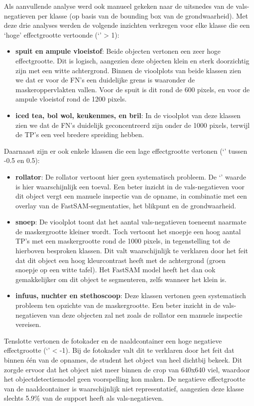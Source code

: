 Als aanvullende analyse werd ook manueel gekeken naar de uitsnedes van de vals-negatieven per klasse (op basis van de bounding box van de grondwaarheid).
Met deze drie analyses werden de volgende inzichten verkregen voor elke klasse die een `hoge' effectgrootte vertoonde (`' > 1):
\begin{itemize}
    \item \textbf{spuit en ampule vloeistof}: Beide objecten vertonen een zeer hoge effectgrootte.
    Dit is logisch, aangezien deze objecten klein en sterk doorzichtig zijn met een witte achtergrond. 
    Binnen de vioolplots van beide klassen zien we dat er voor de FN's een duidelijke grens is waaronder de maskeroppervlakten vallen. 
    Voor de spuit is dit rond de 600 pixels, en voor de ampule vloeistof rond de 1200 pixels.
    \item \textbf{iced tea, bol wol, keukenmes, en bril}: In de vioolplot van deze klassen zien we dat de FN's duidelijk geconcentreerd zijn onder de 1000 pixels,
    terwijl de TP's een veel bredere spreiding hebben. 
\end{itemize}
Daarnaast zijn er ook enkele klassen die een lage effectgrootte vertonen (`' tussen -0.5 en 0.5):
\begin{itemize}
    \item \textbf{rollator}: De rollator vertoont hier geen systematisch probleem. De `' waarde is hier waarschijnlijk een toeval.
    Een beter inzicht in de vals-negatieven voor dit object vergt een manuele inspectie van de opname, in combinatie met een overlay van de FastSAM-segmentaties, het blikpunt en de grondwaarheid.
    \item \textbf{snoep}: De vioolplot toont dat het aantal vals-negatieven toeneemt naarmate de maskergrootte kleiner wordt. 
    Toch vertoont het snoepje een hoog aantal TP's met een maskergrootte rond de 1000 pixels, in tegenstelling tot de hierboven besproken klassen.
    Dit valt waarschijnlijk te verklaren door het feit dat dit object een hoog kleurcontrast heeft met de achtergrond (groen snoepje op een witte tafel).
    Het FastSAM model heeft het dan ook gemakkelijker om dit object te segmenteren, zelfs wanneer het klein is.
    \item \textbf{infuus, nuchter en stethoscoop}: Deze klassen vertonen geen systematisch probleem ten opzichte van de maskergrootte.
    Een beter inzicht in de vals-negatieven van deze objecten zal net zoals de rollator een manuele inspectie vereisen. 
\end{itemize}
Tenslotte vertonen de fotokader en de naaldcontainer een hoge negatieve effectgrootte (`' < -1).
Bij de fotokader valt dit te verklaren door het feit dat binnen één van de opnames, de student het object van heel dichtbij bekeek.
Dit zorgde ervoor dat het object niet meer binnen de crop van 640x640 viel, waardoor het objectdetectiemodel geen voorspelling kon maken.
De negatieve effectgrootte van de naaldcontainer is waarschijnlijk niet representatief, aangezien deze klasse slechts 5.9\% van de support heeft als vals-negatieven.

